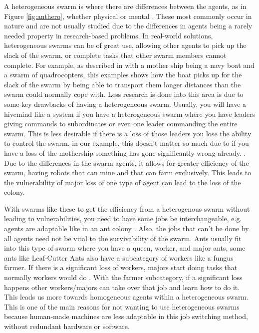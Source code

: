 \documentclass{UoYCSproject}
\begin{document}
A heterogeneous swarm is where there are differences between the agents, as in Figure \ref{fig:anthero}, whether physical or mental \cite{Swarm robotics reviewed, Swarm intellegiegence}. 
These most commonly occur in nature and are not usually studied \cite{Swarm intellegiegence} due to the differences in agents being a rarely needed property in research-based problems.
In real-world solutions, heterogeneous swarms can be of great use, allowing other agents to pick up the slack of the swarm, or complete tasks that other swarm members cannot complete. 
For example, as described in \cite{Swarm robotics reviewed} with a mother ship being a navy boat and a swarm of quadrocopters, this examples shows how the boat picks up for the slack of the swarm by being able to transport them longer distances than the swarm could normally cope with.
Less research is done into this area is due to some key drawbacks of having a heterogeneous swarm.
Usually, you will have a hivemind like a system if you have a heterogeneous swarm where you have leaders giving commands to subordinates or even one leader commanding the entire swarm.
This is less desirable if there is a loss of those leaders you lose the ability to control the swarm, in our example, this doesn't matter so much due to if you have a loss of the mothership something has gone significantly wrong already. .
Due to the differences in the swarm agents, it allows for greater efficiency of the swarm, having robots that can mine and that can farm exclusively. 
This leads to the vulnerability of major loss of one type of agent can lead to the loss of the colony.

With swarms like these to get the efficiency from a heterogenous swarm without leading to vulnerabilities, you need to have some jobs be interchangeable, e.g. agents are adaptable like in an ant colony \cite{Ant communication}. 
Also, the jobs that can't be done by all agents need not be vital to the survivability of the swarm.
Ants usually fit into this type of swarm where you have a queen, worker, and major ants, some ants like Leaf-Cutter Ants also have a subcategory of workers like a fungus farmer.
If there is a significant loss of workers, majors start doing tasks that normally workers would do \cite{Swarm intellegiegence}. 
With the farmer subcategory, if a significant loss happens other workers/majors can take over that job and learn how to do it. 
This leads us more towards homogeneous agents within a heterogeneous swarm.
This is one of the main reasons for not wanting to use heterogeneous swarms because human-made machines are less adaptable in this job switching method, without redundant hardware or software.
\end{document}
